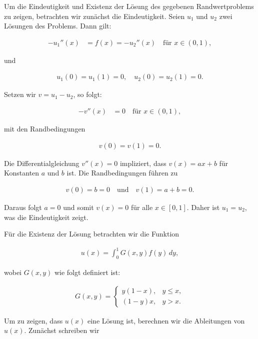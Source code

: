 Um die Eindeutigkeit und Existenz der Lösung des gegebenen Randwertproblems zu zeigen, betrachten wir zunächst die Eindeutigkeit. Seien \( u_1 \) und \( u_2 \) zwei Lösungen des Problems. Dann gilt:

\begin{align*}
-u_1''(x) &= f(x) = -u_2''(x) \quad \text{für } x \in (0,1),
\end{align*}

und

\begin{align*}
u_1(0) = u_1(1) = 0, \quad u_2(0) = u_2(1) = 0.
\end{align*}

Setzen wir \( v = u_1 - u_2 \), so folgt:

\begin{align*}
-v''(x) &= 0 \quad \text{für } x \in (0,1),
\end{align*}

mit den Randbedingungen

\begin{align*}
v(0) = v(1) = 0.
\end{align*}

Die Differentialgleichung \( v''(x) = 0 \) impliziert, dass \( v(x) = ax + b \) für Konstanten \( a \) und \( b \) ist. Die Randbedingungen führen zu

\begin{align*}
v(0) = b = 0 \quad \text{und} \quad v(1) = a + b = 0.
\end{align*}

Daraus folgt \( a = 0 \) und somit \( v(x) = 0 \) für alle \( x \in [0,1] \). Daher ist \( u_1 = u_2 \), was die Eindeutigkeit zeigt.

Für die Existenz der Lösung betrachten wir die Funktion

\begin{align*}
u(x) = \int_0^1 G(x, y) f(y) \, dy,
\end{align*}

wobei \( G(x, y) \) wie folgt definiert ist:

\begin{align*}
G(x, y) = 
\begin{cases} 
y(1-x), & y \leq x, \\ 
(1-y)x, & y > x.
\end{cases}
\end{align*}

Um zu zeigen, dass \( u(x) \) eine Lösung ist, berechnen wir die Ableitungen von \( u(x) \). Zunächst schreiben wir

